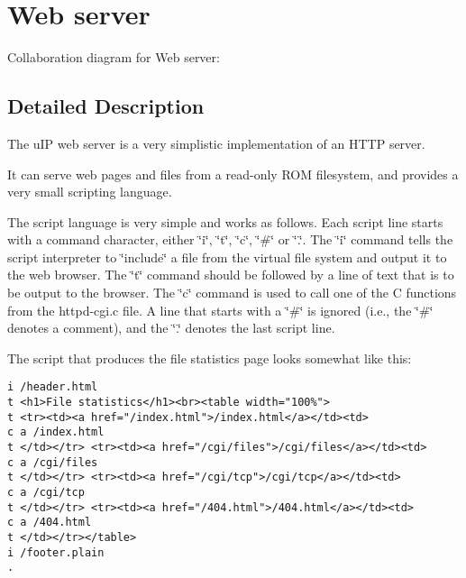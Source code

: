 \hypertarget{a00082}{
\section{Web server}
\label{a00082}
}


Collaboration diagram for Web server:

\subsection{Detailed Description}
The u\-IP web server is a very simplistic implementation of an HTTP server. 

It can serve web pages and files from a read-only ROM filesystem, and provides a very small scripting language.

The script language is very simple and works as follows. Each script line starts with a command character, either \char`\"{}i\char`\"{}, \char`\"{}t\char`\"{}, \char`\"{}c\char`\"{}, \char`\"{}\#\char`\"{} or \char`\"{}.\char`\"{}. The \char`\"{}i\char`\"{} command tells the script interpreter to \char`\"{}include\char`\"{} a file from the virtual file system and output it to the web browser. The \char`\"{}t\char`\"{} command should be followed by a line of text that is to be output to the browser. The \char`\"{}c\char`\"{} command is used to call one of the C functions from the httpd-cgi.c file. A line that starts with a \char`\"{}\#\char`\"{} is ignored (i.e., the \char`\"{}\#\char`\"{} denotes a comment), and the \char`\"{}.\char`\"{} denotes the last script line.

The script that produces the file statistics page looks somewhat like this:



\footnotesize\begin{verbatim}i /header.html
t <h1>File statistics</h1><br><table width="100%">
t <tr><td><a href="/index.html">/index.html</a></td><td>
c a /index.html
t </td></tr> <tr><td><a href="/cgi/files">/cgi/files</a></td><td>
c a /cgi/files
t </td></tr> <tr><td><a href="/cgi/tcp">/cgi/tcp</a></td><td>
c a /cgi/tcp
t </td></tr> <tr><td><a href="/404.html">/404.html</a></td><td>
c a /404.html
t </td></tr></table>
i /footer.plain
.
\end{verbatim}
\normalsize
 

